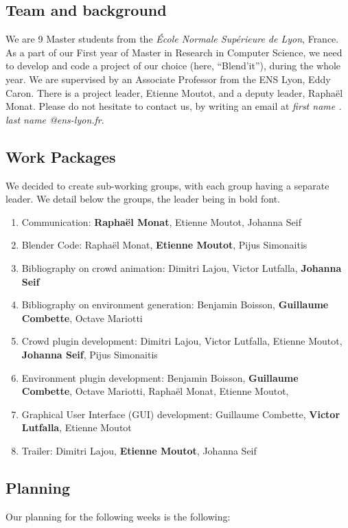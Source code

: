 \documentclass[a4paper,11pt]{article}
\newcommand\bb{Benjamin Boisson}
\newcommand\gc{Guillaume Combette}
\newcommand\dl{Dimitri Lajou}
\newcommand\vl{Victor Lutfalla}
\newcommand\om{Octave Mariotti}
\newcommand\mr{Raphaël Monat} %
\newcommand\me{Etienne Moutot} %
\newcommand\js{Johanna Seif}
\newcommand\ps{Pijus Simonaitis}
\begin{document}
\subsection{Team and background}

We are 9 Master students from the \textit{École Normale Supérieure de Lyon}, France. As a part of our First year of Master in Research in Computer Science, we need to develop and code a project of our choice (here, ``Blend'it''), during the whole year. We are supervised by an Associate Professor from the ENS Lyon, Eddy Caron. There is a project leader, \me, and a deputy leader, \mr. Please do not hesitate to contact us, by writing an email at \textit{first name . last name @ens-lyon.fr}.

\subsection{Work Packages}
We decided to create sub-working groups, with each group having a separate leader. We detail below the groups, the leader being in bold font.

\begin{enumerate}[label=WP\arabic*:, start=0]
\item Communication: \textbf{\mr}, \me, \js
\item Blender Code: \mr, \textbf{\me}, \ps
\item Bibliography on crowd animation: \dl, \vl, \textbf{\js}
\item Bibliography on environment generation: \bb, \textbf{\gc}, \om
\item Crowd plugin development: \dl, \vl, \me, \textbf{\js}, \ps
\item Environment plugin development: \bb, \textbf{\gc}, \om, \mr, \me,
\item Graphical User Interface (GUI) development: \gc, \textbf{\vl}, \me
\item Trailer: \dl, \textbf{\me}, \js
\end{enumerate}

\subsection{Planning}

Our planning for the following weeks is the following:
\end{document}
